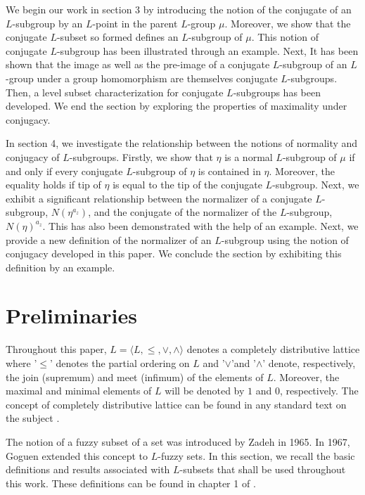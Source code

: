 \documentclass[10pt]{article}
\theoremstyle{plain}
\theoremstyle{definition}
\theoremstyle{remark}
\theoremstyle{case}
\begin{document}
We begin our work in section 3 by introducing the notion of the conjugate of an $L$-subgroup by an $L$-point in the parent $L$-group $\mu$. Moreover, we show that the conjugate $L$-subset so formed defines an $L$-subgroup of $\mu$. This notion of conjugate $L$-subgroup  has been illustrated through an example. Next, It has been shown that the image as well as the pre-image of a conjugate $L$-subgroup of an $L$-group under a group homomorphism are themselves conjugate $L$-subgroups. Then, a level subset characterization for conjugate $L$-subgroups has been developed. We end the section by exploring the properties of maximality under conjugacy. 

In section 4, we investigate the relationship between the notions of normality and conjugacy of $L$-subgroups. Firstly, we show that $\eta$ is a normal $L$-subgroup of $\mu$ if and only if every conjugate $L$-subgroup of $\eta$ is contained in $\eta$. Moreover, the equality holds if tip of $\eta$ is equal to the tip of the conjugate $L$-subgroup. Next, we exhibit a significant relationship between the normalizer of a conjugate $L$-subgroup, $N(\eta^{a_z})$, and the conjugate of the normalizer of the $L$-subgroup, $N(\eta)^{a_z}$. This has also been demonstrated with the help of an example. Next, we provide a new definition of the normalizer of an $L$-subgroup using the notion of conjugacy developed in this paper. We conclude the section by exhibiting this definition by an example.   

\section{Preliminaries}

Throughout this paper, $L = \langle L, \leq, \vee, \wedge  \rangle$ denotes a completely distributive lattice where '$\leq$' denotes the partial ordering on $L$ and '$\vee$'and '$\wedge$' denote, respectively, the join (supremum) and meet (infimum) of the elements of $L$. Moreover, the maximal and minimal elements of $L$ will be denoted by $1$ and $0$, respectively. The concept of completely distributive lattice can be found in any standard text on the subject \cite{gratzer_lattices}. 

The notion of a fuzzy subset of a set was introduced by Zadeh \cite{zadeh_fuzzy} in 1965. In 1967, Goguen \cite{goguen_sets} extended this concept to $L$-fuzzy sets. In this section, we recall the basic definitions and results associated with $L$-subsets that shall be used throughout this work. These definitions can be found in chapter 1 of \cite{mordeson_comm}.
\end{document}

